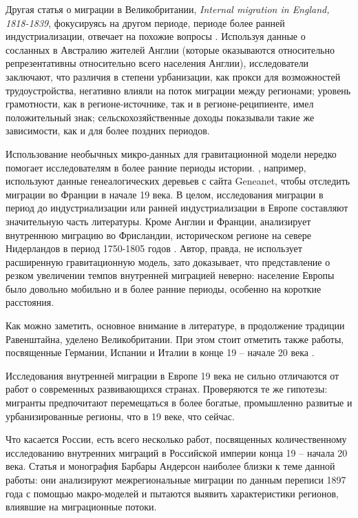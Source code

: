 \documentclass[a4paper,12pt]{article}
\begin{document}
Другая статья о миграции в Великобритании, \emph{Internal migration in England, 1818-1839}, фокусируясь на другом периоде, периоде более ранней индустриализации, отвечает на похожие вопросы \citep{nicholas_internal_1987}. Используя данные о сосланных в Австралию жителей Англии (которые оказываются относительно репрезентативны относительно всего населения Англии), исследователи заключают, что различия в степени урбанизации, как прокси для возможностей трудоустройства, негативно влияли на поток миграции между регионами; уровень грамотности, как в регионе-источнике, так и в регионе-реципиенте, имел положительный знак; сельскохозяйственные доходы показывали такие же зависимости, как и для более поздних периодов.


Использование необычных микро-данных для гравитационной модели нередко помогает исследователям в более ранние периоды истории. \citeauthor{charpentier_internal_2018}, например, используют данные генеалогических деревьев с сайта Geneanet, чтобы отследить миграции во Франции в начале 19 века. В целом, исследования миграции в период до индустриализации или ранней индустриализации в Европе составляют значительную часть литературы. Кроме Англии и Франции, \citeauthor{mccants_internal_1992} анализирует внутреннюю миграцию во Фрисландии, историческом регионе на севере Нидерландов в период 1750-1805 годов \citep{mccants_internal_1992}.  Автор, правда, не использует расширенную гравитационную модель, зато доказывает, что представление о резком увеличении темпов внутренней миграцией неверно: население Европы было довольно мобильно и в более ранние периоды, особенно на короткие расстояния.

Как можно заметить, основное внимание в литературе, в продолжение традиции Равенштайна, уделено Великобритании. При этом стоит отметить также работы, посвященные Германии, Испании и Италии в конце 19 – начале 20 века \citep{silvestre_internal_2005, hochstadt_migration_1981, hogan_migration_1985}.

Исследования внутренней миграции в Европе 19 века не сильно отличаются от работ о современных развивающихся странах. Проверяются те же гипотезы: мигранты предпочитают перемещаться в более богатые, промышленно развитые и урбанизированные регионы, что в 19 веке, что сейчас.


Что касается России, есть всего несколько работ, посвященных количественному исследованию внутренних миграций в Российской империи конца 19 – начала 20 века. Статья \citeauthor{leasure_internal_1968} и монография Барбары Андерсон \citep{anderson_internal_1980} наиболее близки к теме данной работы: они анализируют межрегиональные миграции по данным переписи 1897 года с помощью макро-моделей и пытаются выявить характеристики регионов, влиявшие на миграционные потоки.
\end{document}
